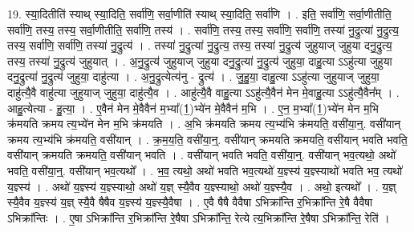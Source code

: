 \documentclass[17pt]{extarticle}
\begin{document}
19. स्या॒दितीति॑ स्याथ् स्या॒दिति॒ सर्वा॑णि॒ सर्वा॒णीति॑ स्याथ् स्या॒दिति॒ सर्वा॑णि । . इति॒ सर्वा॑णि॒ सर्वा॒णीतीति॒ सर्वा॑णि॒ तस्य॒ तस्य॒ सर्वा॒णीतीति॒ सर्वा॑णि॒ तस्य॑ । . सर्वा॑णि॒ तस्य॒ तस्य॒ सर्वा॑णि॒ सर्वा॑णि॒ तस्या॑ नु॒द्रुत्या॑ नु॒द्रुत्य॒ तस्य॒ सर्वा॑णि॒ सर्वा॑णि॒ तस्या॑ नु॒द्रुत्य॑ । . तस्या॑ नु॒द्रुत्या॑ नु॒द्रुत्य॒ तस्य॒ तस्या॑ नु॒द्रुत्य॑ जुहुयाज् जुहुया दनु॒द्रुत्य॒ तस्य॒ तस्या॑ नु॒द्रुत्य॑ जुहुयात् । . अ॒नु॒द्रुत्य॑ जुहुयाज् जुहुया दनु॒द्रुत्या॑ नु॒द्रुत्य॑ जुहुया॒ दाहु॒त्या ऽऽहु॑त्या जुहुया दनु॒द्रुत्या॑ नु॒द्रुत्य॑ जुहुया॒ दाहु॑त्या । . अ॒नु॒द्रुत्येत्य॑नु - द्रुत्य॑ । . जु॒हु॒या॒ दाहु॒त्या ऽऽहु॑त्या जुहुयाज् जुहुया॒ दाहु॑त्यै॒वै वाहु॑त्या जुहुयाज् जुहुया॒ दाहु॑त्यै॒व । . आहु॑त्यै॒वै वाहु॒त्या ऽऽहु॑त्यै॒वैन॑ मेन मे॒वाहु॒त्या ऽऽहु॑त्यै॒वैन᳚म् । . आहु॒त्येत्या - हु॒त्या॒ । . ए॒वैन॑ मेन मे॒वैवैन॑ म॒भ्या᳚(1॒)भ्ये॑न मे॒वैवैन॑ म॒भि । . ए॒न॒ म॒भ्या᳚(1॒)भ्ये॑न मेन म॒भि क्र॑मयति क्रमय त्य॒भ्ये॑न मेन म॒भि क्र॑मयति । . अ॒भि क्र॑मयति क्रमय त्य॒भ्य॑भि क्र॑मयति॒ वसी॑या॒न्॒. वसी॑यान् क्रमय त्य॒भ्य॑भि क्र॑मयति॒ वसी॑यान् । . क्र॒म॒य॒ति॒ वसी॑या॒न्॒. वसी॑यान् क्रमयति क्रमयति॒ वसी॑यान् भवति भवति॒ वसी॑यान् क्रमयति क्रमयति॒ वसी॑यान् भवति । . वसी॑यान् भवति भवति॒ वसी॑या॒न्॒. वसी॑यान् भव॒त्यथो॒ अथो॑ भवति॒ वसी॑या॒न्॒. वसी॑यान् भव॒त्यथो᳚ । . भ॒व॒ त्यथो॒ अथो॑ भवति भव॒त्यथो॑ य॒ज्ञ्स्य॑ य॒ज्ञ्स्याथो॑ भवति भव॒ त्यथो॑ य॒ज्ञ्स्य॑ । . अथो॑ य॒ज्ञ्स्य॑ य॒ज्ञ्स्याथो॒ अथो॑ य॒ज्ञ् स्यै॒वैव य॒ज्ञ्स्याथो॒ अथो॑ य॒ज्ञ्स्यै॒व । . अथो॒ इत्यथो᳚ । . य॒ज्ञ् स्यै॒वैव य॒ज्ञ्स्य॑ य॒ज्ञ् स्यै॒वै षैषैव य॒ज्ञ्स्य॑ य॒ज्ञ्स्यै॒वैषा । . ए॒वै षैषै वैवैषा ऽभिक्रा᳚न्ति र॒भिक्रा᳚न्ति रे॒षै वैवैषा ऽभिक्रा᳚न्तिः । . ए॒षा ऽभिक्रा᳚न्ति र॒भिक्रा᳚न्ति रे॒षैषा ऽभिक्रा᳚न्ति॒ रेत्ये त्य॒भिक्रा᳚न्ति रे॒षैषा ऽभिक्रा᳚न्ति॒ रेति॑ । \newline
\end{document}
